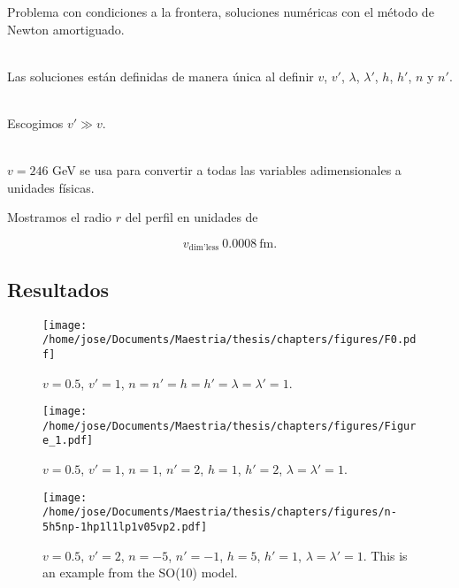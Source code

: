 \documentclass[14pt]{beamer}
\begin{document}
\begin{frame}

Problema  con condiciones a la frontera, soluciones numéricas con el método de Newton amortiguado.\\~\

Las soluciones están definidas de manera única al definir $v$, $v'$, $\lambda$, $\lambda'$, $h$, $h'$, $n$ y $n'$.\\~\

Escogimos $v'\gg v$. \\~\

$v=246$ GeV se usa para convertir a todas las variables adimensionales a unidades físicas.
\end{frame}


 \begin{frame}
Mostramos el radio $r$ del perfil en unidades de 
 
 \begin{equation*}
	 v_{\text{dim'less}} \ 0.0008 \ \text{fm}.
\end{equation*}


 \end{frame}

\subsection{Resultados}


\begin{frame}
\begin{figure}
	\centering
	\texttt{[image: /home/jose/Documents/Maestria/thesis/chapters/figures/F0.pdf]}
	\caption{$v=0.5$, $v'=1$, $n=n'=h=h'=\lambda=\lambda'=1$.}
\end{figure}
\end{frame}

\begin{frame}
\begin{figure}
	\centering
	\texttt{[image: /home/jose/Documents/Maestria/thesis/chapters/figures/Figure\_1.pdf]}
	\caption{$v = 0.5$, $v'=1$, $n=1$, $n'=2$, $h=1$, $h'=2$, $\lambda=\lambda'=1$.}
\end{figure}
\end{frame}

\begin{frame}
\begin{figure}
	\centering
	\texttt{[image: /home/jose/Documents/Maestria/thesis/chapters/figures/n-5h5np-1hp1l1lp1v05vp2.pdf]}
	\caption{$v = 0.5$, $v'=2$, $n=-5$, $n'=-1$, $h=5$, $h'=1$, $\lambda=\lambda'=1$. This is an example from the SO(10) model.}
	\label{fig:n-5h5np-1hp1l1lp1v05vp2}
\end{figure}
\end{frame}
\end{document}
